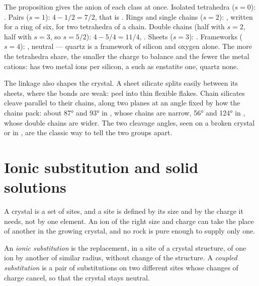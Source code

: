 The proposition gives the anion of each class at once. Isolated tetrahedra
($s = 0$): . Pairs ($s = 1$): $4 - 1/2 = 7/2$, that is
. Rings and single chains ($s = 2$): , written
 for a ring of six,  for two tetrahedra of a
chain. Double chains (half with $s = 2$, half with $s = 3$, so $s = 5/2$):
$4 - 5/4 = 11/4$, . Sheets ($s = 3$): .
Frameworks ($s = 4$): , neutral --- quartz is a framework of
silicon and oxygen alone. The more the tetrahedra share, the smaller the
charge to balance and the fewer the metal cations:   has
two metal ions per silicon, a  such as enstatite  one,
quartz none.

The linkage also shapes the crystal. A sheet silicate splits easily between
its sheets, where the bonds are weak:  peel into thin flexible flakes.
Chain silicates cleave parallel to their chains, along two planes at an angle
fixed by how the chains pack: about \ang{87} and \ang{93} in , whose
chains are narrow, \ang{56} and \ang{124} in , whose double chains
are wider. The two cleavage angles, seen on a broken crystal or in , are the classic way to tell the two groups apart.

\section{Ionic substitution and solid solutions}

A crystal is a set of sites, and a site is defined by its size and by the
charge it needs, not by one element. An ion of the right size and charge can
take the place of another in the growing crystal, and no rock is pure enough
to supply only one.

\begin{definition}\label{def:b1:rock-forming-minerals:substitution}
An \emph{ionic substitution} is the replacement,
in a site of a crystal structure, of one ion by another of similar radius,
without change of the structure. A \emph{coupled
substitution} is a pair of substitutions on two
different sites whose changes of charge cancel, so that the crystal stays
neutral.
\end{definition}

